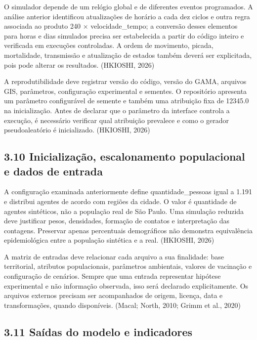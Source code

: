O simulador depende de um relógio global e de diferentes eventos
programados. A análise anterior identificou atualizações de horário a
cada dez ciclos e outra regra associada ao produto 240 ×
velocidade\_tempo; a conversão desses elementos para horas e dias
simulados precisa ser estabelecida a partir do código inteiro e
verificada em execuções controladas. A ordem de movimento, picada,
mortalidade, transmissão e atualização de estados também deverá ser
explicitada, pois pode alterar os resultados. (HKIOSHI, 2026)

A reprodutibilidade deve registrar versão do código, versão do GAMA,
arquivos GIS, parâmetros, configuração experimental e sementes. O
repositório apresenta um parâmetro configurável de semente e também uma
atribuição fixa de 12345.0 na inicialização. Antes de declarar que o
parâmetro da interface controla a execução, é necessário verificar qual
atribuição prevalece e como o gerador pseudoaleatório é inicializado.
(HKIOSHI, 2026)

\subsection{3.10 Inicialização, escalonamento populacional e dados de
entrada}\label{inicializauxe7uxe3o-escalonamento-populacional-e-dados-de-entrada}

A configuração examinada anteriormente define quantidade\_pessoas igual
a 1.191 e distribui agentes de acordo com regiões da cidade. O valor é
quantidade de agentes sintéticos, não a população real de São Paulo. Uma
simulação reduzida deve justificar pesos, densidades, formação de
contatos e interpretação das contagens. Preservar apenas percentuais
demográficos não demonstra equivalência epidemiológica entre a população
sintética e a real. (HKIOSHI, 2026)

A matriz de entradas deve relacionar cada arquivo a sua finalidade: base
territorial, atributos populacionais, parâmetros ambientais, valores de
vacinação e configuração de cenários. Sempre que uma entrada representar
hipótese experimental e não informação observada, isso será declarado
explicitamente. Os arquivos externos precisam ser acompanhados de
origem, licença, data e transformações, quando disponíveis. (Macal;
North, 2010; Grimm et al., 2020)

\subsection{3.11 Saídas do modelo e
indicadores}\label{sauxeddas-do-modelo-e-indicadores}

